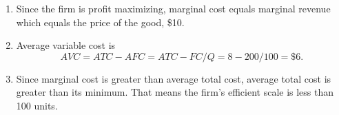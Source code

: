 \documentclass{article}
\begin{document}
\begin{enumerate}
\begin{enumerate}
	\item Since the firm is profit maximizing, marginal cost equals marginal revenue which equals the price of the good, \$10.
	
	\item Average variable cost is 
	\[ AVC = ATC - AFC = ATC - FC/Q = 8 - 200/100 = \$6.\]
	
	\item Since marginal cost is greater than average total cost, average total cost is greater than its minimum. That means the firm's efficient scale is less than 100 units.
	
	\end{enumerate}

\end{enumerate}
\end{document}
